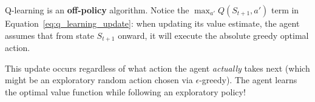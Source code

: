 \begin{keyidea}
Q-learning is an \textbf{off-policy} algorithm. 
Notice the $\max_{a'} Q(S_{t+1}, a')$ term in Equation~\eqref{eq:q_learning_update}: when updating its value estimate, the agent assumes that from state $S_{t+1}$ onward, it will execute the absolute greedy optimal action. 

This update occurs regardless of what action the agent \emph{actually} takes next (which might be an exploratory random action chosen via $\epsilon$-greedy). The agent learns the optimal value function while following an exploratory policy!
\end{keyidea}

